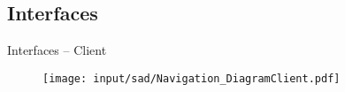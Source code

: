 \subsection{Interfaces}
\begin{frame}{Interfaces -- Client}

\begin{figure}[htbp]
	\begin{center}
	\texttt{[image: input/sad/Navigation\_DiagramClient.pdf]}
	\end{center}
\end{figure}

\end{frame}